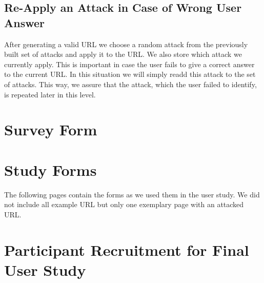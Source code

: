 \subsection{Re-Apply an Attack in Case of Wrong User Answer}
After generating a valid URL we choose a random attack from the previously built set of attacks and apply it to the URL. We also store which attack we currently apply. This is important in case  the user fails to give a correct answer to the current URL. In this situation we will simply readd this attack to the set of attacks.
This way, we assure that the attack, which the user failed to identify, is repeated later in this level.

\section{Survey Form}
\label{s:presurvey_form}


\section{Study Forms}
The following pages contain the forms as we used them in the user study. We did not include all example URL but only one exemplary page with an attacked URL.
\label{s:before_survey}

\label{s:url_survey}

\label{s:after_survey}


\section{Participant Recruitment for Final User Study}
\label{s:participant_recruitment_texts}

